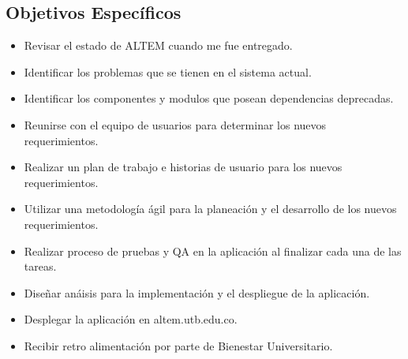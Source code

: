 \subsection{Objetivos Específicos}
\begin{itemize}
    \item Revisar el estado de ALTEM cuando me fue entregado.
    \item Identificar los problemas que se tienen en el sistema actual.
    \item Identificar los componentes y modulos que posean dependencias deprecadas.
    \item Reunirse con el equipo de usuarios para determinar los nuevos requerimientos.
    \item Realizar un plan de trabajo e historias de usuario para los nuevos requerimientos.
    \item Utilizar una metodología ágil para la planeación y el desarrollo de los nuevos requerimientos.
    \item Realizar proceso de pruebas y QA en la aplicación al finalizar cada una de las tareas.
    \item Diseñar anáisis para la implementación y el despliegue de la aplicación.
    \item Desplegar la aplicación en altem.utb.edu.co.
    \item Recibir retro alimentación por parte de Bienestar Universitario.
\end{itemize}